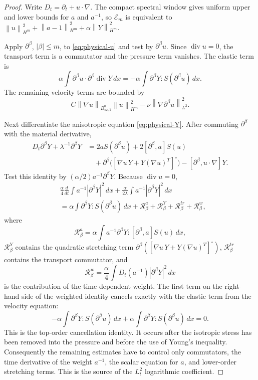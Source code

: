 \documentclass[10pt,a4paper]{amsart}
\newcommand{\Besov}{B^0_{\infty,1}}
\newcommand{\calE}{\mathcal E}
\newcommand{\calR}{\mathcal R}
\newcommand{\divv}{\operatorname{div}}
\newcommand{\norm}[1]{\left\lVert #1\right\rVert}
\begin{document}
\begin{proof}
Write \(D_t=\partial_t+u\cdot\nabla\).  The compact spectral window gives
uniform upper and lower bounds for \(a\) and \(a^{-1}\), so \(\calE_m\) is
equivalent to
\(\norm{u}_{H^m}^2+\norm{a-1}_{H^m}^2+\alpha\norm{Y}_{H^m}^2\).

Apply \(\partial^\beta\), \(|\beta|\le m\), to
\eqref{eq:physical-u} and test by \(\partial^\beta u\).  Since \(\divv u=0\),
the transport term is a commutator and the pressure term vanishes.  The elastic
term is
\[
  \alpha\int \partial^\beta u\cdot\partial^\beta\divv Y\,dx
  =-\alpha\int \partial^\beta Y:S(\partial^\beta u)\,dx .
  \label{eq:principal-velocity-coupling}
\]
The remaining velocity terms are bounded by
\[
  C\norm{\nabla u}_{\Besov}\norm{u}_{H^m}^2
  -\nu\norm{\nabla\partial^\beta u}_{L^2}^2 .
\]

Next differentiate the anisotropic equation \eqref{eq:physical-Y}.  After
commuting \(\partial^\beta\) with the material derivative,
\[
\begin{aligned}
  D_t\partial^\beta Y+\lambda^{-1}\partial^\beta Y
  &=2aS(\partial^\beta u)
    +2[\partial^\beta,a]S(u)  \\
  &\quad+\partial^\beta\bigl([
      \nabla u\,Y+Y(\nabla u)^T]^\circ\bigr)
    -[\partial^\beta,u\cdot\nabla]Y .
\end{aligned}
\]
Test this identity by \((\alpha/2)a^{-1}\partial^\beta Y\).  Because
\(\divv u=0\),
\[
\begin{aligned}
  &\frac{\alpha}{4}\frac{d}{dt}\int a^{-1}|\partial^\beta Y|^2\,dx
  +\frac{\alpha}{2\lambda}\int a^{-1}|\partial^\beta Y|^2\,dx  \\
  &=\alpha\int \partial^\beta Y:S(\partial^\beta u)\,dx
    +\calR_\beta^{a}+\calR_\beta^{Y}
    +\calR_\beta^{tr}+\calR_\beta^{w},
\end{aligned}
\label{eq:weighted-Y-identity}
\]
where
\[
  \calR_\beta^{a}
  =\alpha\int a^{-1}\partial^\beta Y:
  [\partial^\beta,a]S(u)\,dx,
\]
\(\calR_\beta^Y\) contains the quadratic stretching term
\(\partial^\beta([\nabla u\,Y+Y(\nabla u)^T]^\circ)\),
\(\calR_\beta^{tr}\) contains the transport commutator, and
\[
  \calR_\beta^{w}
  =\frac{\alpha}{4}\int D_t(a^{-1})|\partial^\beta Y|^2\,dx
\]
is the contribution of the time-dependent weight.  The first term on the right-hand side of the weighted identity cancels exactly
with the elastic term from the velocity equation:
\[
  -\alpha\int \partial^\beta Y:S(\partial^\beta u)\,dx
  +\alpha\int \partial^\beta Y:S(\partial^\beta u)\,dx=0.
\]
This is the top-order cancellation identity.  It occurs after the isotropic
stress has been removed into the pressure and before the use of Young's
inequality.  Consequently the remaining estimates have to control only
commutators, the time derivative of the weight \(a^{-1}\), the scalar equation
for \(a\), and lower-order stretching terms.  This is the source of the
\(L^2_t\) logarithmic coefficient.


\end{proof}
\end{document}
